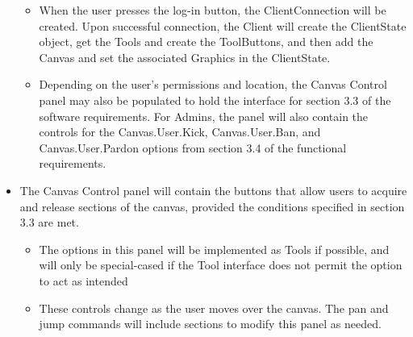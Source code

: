 \documentclass[12pt]{article}
\begin{document}
\begin{itemize}
\begin{itemize}
     \item
     When the user presses the log-in button, the ClientConnection will be
     created. Upon successful connection, the Client will create the
     ClientState object, get the Tools and create the ToolButtons, and then add
     the Canvas and set the associated Graphics in the ClientState.
     \item
     Depending on the user's permissions and location, the Canvas Control panel may also
     be populated to hold the interface for section 3.3 of the software
     requirements. For Admins, the panel will also contain the controls for the
     Canvas.User.Kick, Canvas.User.Ban, and Canvas.User.Pardon options from
     section 3.4 of the functional requirements.
     \end{itemize}
     \item 
     The Canvas Control panel will contain the buttons that allow users to
     acquire and release sections of the canvas, provided the conditions
     specified in section 3.3 are met.
     \begin{itemize}
     \item
     The options in this panel will be implemented as Tools if possible, and
     will only be special-cased if the Tool interface does not permit the
     option to act as intended
     \item
     These controls change as the user moves over the canvas. The pan and jump
     commands will include sections to modify this panel as needed.
    \end{itemize}
     
     \end{itemize}
\end{document}
